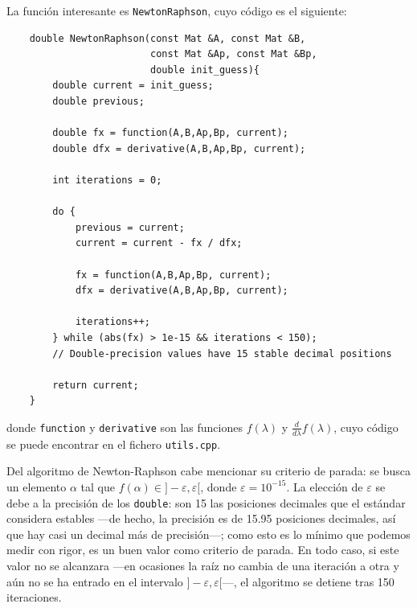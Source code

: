 \documentclass[a4paper, 11pt]{article}
\theoremstyle{definition}
\begin{document}
    La función interesante es \lstinline{NewtonRaphson}, cuyo código es el siguiente:
    \begin{lstlisting}
    double NewtonRaphson(const Mat &A, const Mat &B,
                         const Mat &Ap, const Mat &Bp,
                         double init_guess){
        double current = init_guess;
        double previous;

        double fx = function(A,B,Ap,Bp, current);
        double dfx = derivative(A,B,Ap,Bp, current);

        int iterations = 0;

        do {
            previous = current;
            current = current - fx / dfx;

            fx = function(A,B,Ap,Bp, current);
            dfx = derivative(A,B,Ap,Bp, current);

            iterations++;
        } while (abs(fx) > 1e-15 && iterations < 150);
        // Double-precision values have 15 stable decimal positions

        return current;
    }
    \end{lstlisting}
    donde \lstinline{function} y \lstinline{derivative} son las funciones $f(\lambda)$ y $\frac{d}{d\lambda}f(\lambda)$, cuyo código se puede encontrar en el fichero \lstinline{utils.cpp}.

    Del algoritmo de Newton-Raphson cabe mencionar su criterio de parada: se busca un elemento $\alpha$ tal que $f(\alpha) \in ]-\varepsilon, \varepsilon[$, donde $\varepsilon = 10^{-15}$. La elección de $\varepsilon$ se debe a la precisión de los \lstinline{double}: son 15 las posiciones decimales que el estándar considera estables ---de hecho, la precisión es de 15.95 posiciones decimales, así que hay casi un decimal más de precisión---; como esto es lo mínimo que podemos medir con rigor, es un buen valor como criterio de parada. En todo caso, si este valor no se alcanzara ---en ocasiones la raíz no cambia de una iteración a otra y aún no se ha entrado en el intervalo $]-\varepsilon, \varepsilon[$---, el algoritmo se detiene tras 150 iteraciones.
\end{document}

